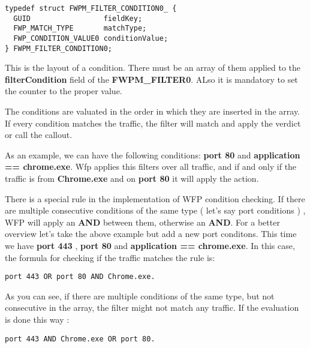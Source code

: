 \vspace{5mm}

\begin{lstlisting}
typedef struct FWPM_FILTER_CONDITION0_ {
  GUID                 fieldKey;
  FWP_MATCH_TYPE       matchType;
  FWP_CONDITION_VALUE0 conditionValue;
} FWPM_FILTER_CONDITION0;
\end{lstlisting}

\vspace{5mm}

This is the layout of a condition. There must be an array of them applied to the \textbf{filterCondition} field of the \textbf{FWPM\_FILTER0}. ALso it is mandatory to set the counter to the proper value.

\vspace{5mm}

The conditions are valuated in the order in which they are inserted in the array. If every condition matches the traffic, the filter will match and apply the verdict or call the callout. 

\vspace{5mm}

As an example, we can have the following conditions: \textbf{port 80} and \textbf{application == chrome.exe}. Wfp applies this filters over all traffic, and if and only if the traffic is from \textbf{Chrome.exe} and on \textbf{port 80} it will apply the action.

\vspace{5mm}

There is a special rule in the implementation of WFP condition checking. If there are multiple consecutive conditions of the same type ( let's say port conditions ) , WFP will apply an \textbf{AND} between them, otherwise an \textbf{AND}. For a better overview let's take the above example but add
a new port conditons. This time we have \textbf{port 443} , \textbf{port 80} and \textbf{application == chrome.exe}. In this case, the formula for checking if the traffic matches the rule is:
\vspace{5mm}

\begin{lstlisting}
port 443 OR port 80 AND Chrome.exe.
\end{lstlisting}

As you can see, if there are multiple conditions of the same type, but not consecutive in the array, the filter might not match any traffic. If the evaluation is done this way : 

\begin{lstlisting}
port 443 AND Chrome.exe OR port 80.
\end{lstlisting}

